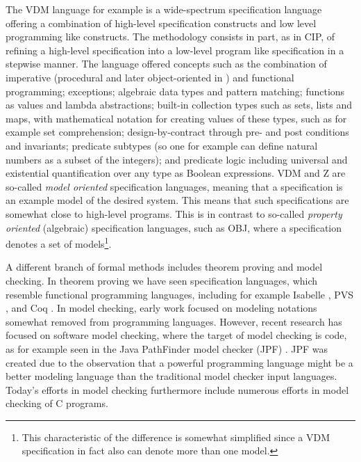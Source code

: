 The VDM language for example is a wide-spectrum specification 
language offering a combination of high-level specification 
constructs and low level programming like constructs. The 
methodology 
consists in part, as in CIP, of refining a high-level specification 
into a low-level program like specification in a stepwise manner. 
The language offered concepts 
such as the combination of imperative (procedural and later 
object-oriented in \vdmpp) and functional programming; exceptions; 
algebraic data types and pattern matching; functions as values and 
lambda abstractions; built-in collection types such as sets, lists 
and maps, with mathematical notation for creating values of these 
types, such as for example set comprehension; design-by-contract 
through pre- and post conditions and invariants; predicate subtypes 
(so one for example can define natural numbers as a subset of the 
integers);  and predicate logic including universal and existential 
quantification over any type as Boolean expressions.  VDM and Z are 
so-called {\em model oriented} specification languages, 
meaning that a specification is an example model of the desired system. This means that such specifications are somewhat close to high-level programs. This is in contrast to so-called {\em property oriented} (algebraic) specification languages, such as OBJ, where a specification denotes a set of models\footnote{This characteristic of the difference is somewhat simplified since a VDM specification in fact also can denote more than one model.}.  

A different branch of formal methods includes theorem proving and 
model checking. In theorem proving we have seen specification 
languages, which resemble functional programming languages, 
including for example Isabelle \cite{isabelle}, PVS \cite{pvs}, and Coq \cite{coq}. In model checking, early 
work focused on modeling notations somewhat removed from 
programming languages. However, recent research has focused on 
software model checking, where the target of model checking is 
code, as for example seen in the Java PathFinder model checker 
(JPF) \cite{havelund-jpf-00,havelund-visser02}. JPF was created due 
to the observation that a powerful 
programming language might be a better modeling language than the 
traditional model checker input languages. Today’s 
efforts in model checking furthermore include numerous efforts in 
model checking of C programs.

